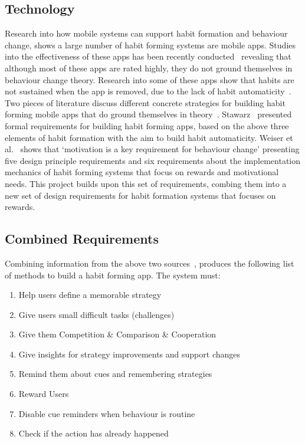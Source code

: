 \subsection{Technology}
Research into how mobile systems can support habit formation and behaviour change, shows a large number of habit forming systems are mobile apps. Studies into the effectiveness of these apps has been recently conducted~\cite{article_beyond_self_tracking_designing_apps, article_dont_kick_habit} revealing that although most of these apps are rated highly, they do not ground themselves in behaviour change theory. Research into some of these apps show that habits are not sustained when the app is removed, due to the lack of habit automaticity~\cite{article_beyond_self_tracking_designing_apps}.\newline
\newline
Two pieces of literature discuss different concrete strategies for building habit forming mobile apps that do ground themselves in theory~\cite{thesis_kathy, article_taxonomy_motivational_affordances_meaningful}. Stawarz~\cite{thesis_kathy} presented formal requirements for building habit forming apps, based on the above three elements of habit formation with the aim to build habit automaticity. Weiser et al.~\cite{article_taxonomy_motivational_affordances_meaningful} shows that `motivation is a key requirement for behaviour change' presenting five design principle requirements and six requirements about the implementation mechanics of habit forming systems that focus on rewards and motivational needs. This project builds upon this set of requirements, combing them into a new set of design requirements for habit formation systems that focuses on rewards.

\subsection{Combined Requirements}
Combining information from the above two sources~\cite{thesis_kathy, article_taxonomy_motivational_affordances_meaningful}, produces the following list of methods to build a habit forming app.\newline
\newline
The system must:

\begin{enumerate}
  \item Help users define a memorable strategy
  \item Give users small difficult tasks (challenges)
  \item Give them Competition \& Comparison \& Cooperation
  \item Give insights for strategy improvements and support changes
  \item Remind them about cues and remembering strategies
  \item Reward Users
  \item Disable cue reminders when behaviour is routine
  \item Check if the action has already happened
\end{enumerate}

